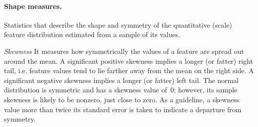\paragraph{Shape measures.}
Statistics that describe the shape and symmetry of the quantitative (scale)
feature distribution estimated from a sample of its values.
\begin{Description}
\item[\it Skewness]
\OutputRowText{\OutputRowIDSkewness}
It measures how symmetrically the values of a feature are spread out
around the mean.  A significant positive skewness implies a longer (or fatter)
right tail, i.e. feature values tend to lie farther away from the mean on the
right side.  A significant negative skewness implies a longer (or fatter) left
tail.  The normal distribution is symmetric and has a skewness value of~0;
however, its sample skewness is likely to be nonzero, just close to zero.
As a guideline, a skewness value more than twice its standard error is taken
to indicate a departure from symmetry.


\end{Description}
